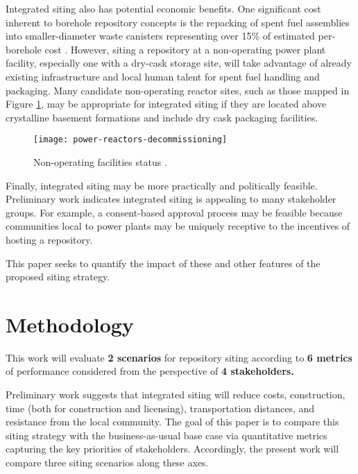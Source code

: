 Integrated siting also has potential economic benefits. One significant cost 
inherent to borehole repository concepts is the repacking of spent fuel 
assemblies into smaller-diameter waste canisters representing over 15\% of 
estimated per-borehole cost \cite{arnold_reference_2011}.  However, siting a 
repository at a non-operating power plant facility, especially one with a 
dry-cask storage site, will take advantage of already existing infrastructure 
and local human talent for spent fuel handling and packaging. Many candidate 
non-operating reactor sites, such as those mapped in Figure \ref{fig:shutdown}, 
may be appropriate for integrated siting if they are located above crystalline 
basement formations and include dry cask packaging facilities.

\begin{figure}[htpb!] 
  \centering
  \texttt{[image: power-reactors-decommissioning]}	
  \caption{Non-operating facilities status
  \cite{nuclear_regulatory_commission_nrc_2015}.}
  \label{fig:shutdown}
\end{figure}

Finally, integrated siting may be more practically and politically feasible. 
Preliminary work \cite{waleed_regional_2015} indicates integrated siting is 
appealing to many stakeholder groups. For example, a consent-based approval 
process may be feasible because communities local to power plants may be 
uniquely receptive to the incentives of hosting a repository. 

This paper seeks to quantify the impact of these and other features of the 
proposed siting strategy. 


\section{Methodology}

This work will evaluate \textbf{2 scenarios} for repository siting according to \textbf{6 metrics} of 
performance considered from the perspective of \textbf{4 stakeholders.}

Preliminary work \cite{waleed_regional_2015} suggests that integrated siting 
will reduce costs, construction, time (both for construction and licensing), 
transportation distances, and resistance from the local community.  
The goal of this paper is to compare this siting strategy with the 
business-as-usual base case via quantitative metrics capturing the key 
priorities of stakeholders. Accordingly, the present 
work will compare three siting scenarios along these axes. 

